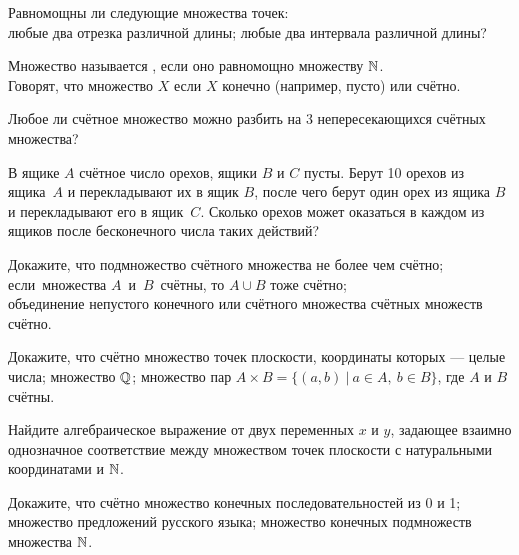 \documentclass[a4paper,12pt]{article}
\begin{document}
 Равномощны ли следующие множества точек:\\
 любые два отрезка различной длины;
 любые два интервала различной длины?


 Множество называется , если
оно равномощно множеству $\mathbb{N}$.\\
Говорят, что множество $X$  если $X$ конечно (например, пусто)
или сч\"етно.


Любое ли сч\"етное множество можно разбить на 3
непересекающихся сч\"етных множества?

В ящике $A$  сч\"етное число орехов,
ящики $B$ и $C$  пусты. Берут 10 орехов из ящика~$A$
и перекладывают их в ящик $B$, после чего берут
один орех из ящика $B$ и перекладывают его в ящик~$C$.
Сколько орехов может оказаться в каждом из ящиков после
бесконечного числа таких действий?


Докажите, что
подмножество сч\"етного множества не более чем сч\"етно;\\
если~множества $A$~и~$B$~сч\"ет\-ны, %
то $A \cup B$ тоже
сч\"етно;\\
объединение непустого конечного или сч\"етного множества сч\"етных множеств сч\"етно.

 Докажите, что сч\"етно
 множество точек плоскости, координаты
которых --- целые числа;
 множество $\mathbb{Q}$;
 множество пар $A\times B=\{(a,b)\ |\ a\in A,\ b\in B\}$,
где $A$ и $B$ сч\"етны.

Найдите алгебраическое выражение от двух переменных $x$ и $y$,
задающее взаимно однозначное соответствие между
множеством точек плоскости с натуральными координатами и $\mathbb{N}$.

 Докажите, что сч\"етно \quad
 множество конечных последовательностей из 0 и 1;\\
 множество предложений русского языка;
 множество конечных подмножеств множества $\mathbb{N}$.
\end{document}
